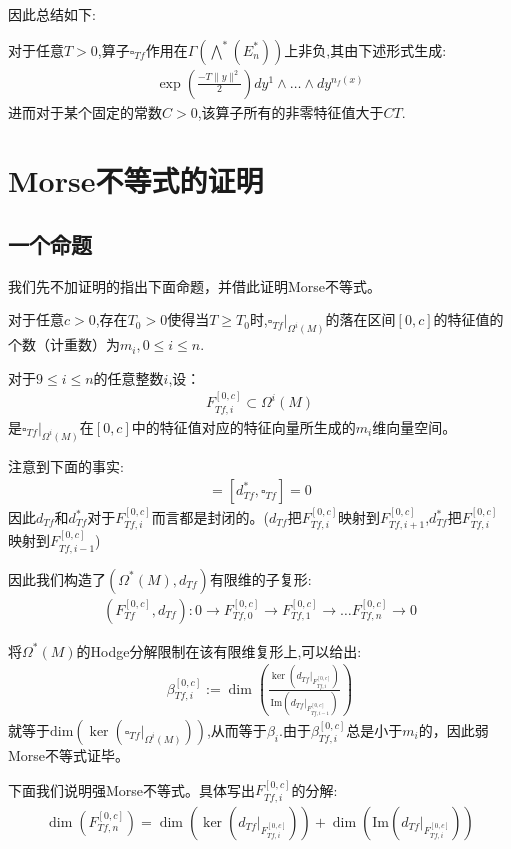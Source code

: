 因此总结如下:
\begin{proposition}
	对于任意$T>0$,算子$\square_{Tf}$作用在$\Gamma(\bigwedge^*(E_n^*))$上非负,其由下述形式生成:
	\begin{align}
		\exp(\frac{-T\|y\|^2}{2})dy^1\wedge \dots \wedge dy^{n_f(x)}
	\end{align}
	进而对于某个固定的常数$C>0$,该算子所有的非零特征值大于$CT$.
\end{proposition}
\section{Morse不等式的证明}
\subsection{一个命题}
我们先不加证明的指出下面命题，并借此证明Morse不等式。
\begin{proposition}
	对于任意$c>0$,存在$T_0>0$使得当$T\geq T_0$时,$\square_{Tf}|_{\Omega^i(M)}$的落在区间$[0,c]$的特征值的个数（计重数）为$m_i,0 \leq i \leq n$.
\end{proposition}

对于$9 \leq i \leq n$的任意整数$i$,设：
\begin{align*}
	F_{Tf,i}^{[0,c]}\subset \Omega^i(M)
\end{align*}
是$\square_{Tf}|_{\Omega^i(M)}$在$[0,c]$中的特征值对应的特征向量所生成的$m_i$维向量空间。

注意到下面的事实:
\begin{align*}
	[d_{Tf},\square_{Tf}]=[d^*_{Tf},\square_{Tf}]=0
\end{align*}
因此$d_{Tf}$和$d_{Tf}^*$对于$F_{Tf,i}^{[0,c]}$而言都是封闭的。($d_{Tf}$把$F_{Tf,i}^{[0,c]}$映射到$F_{Tf,i+1}^{[0,c]}$,$d^*_{Tf}$把$F_{Tf,i}^{[0,c]}$映射到$F_{Tf,i-1}^{[0,c]}$)

因此我们构造了$(\Omega^*(M),d_{Tf})$有限维的子复形:
\begin{align}
	(F_{Tf}^{[0,c]},d_{Tf}):0 \longrightarrow F_{Tf,0}^{[0,c]} \longrightarrow F_{Tf,1}^{[0,c]} \longrightarrow \dots F_{Tf,n}^{[0,c]} \longrightarrow 0
\end{align}

将$\Omega^*(M)$的Hodge分解限制在该有限维复形上,可以给出:
\begin{align}
	\beta_{Tf,i}^{[0,c]}:=\dim (\frac{\ker(d_{Tf}|_{F_{Tf,i}^{[0,c]}})}{\mathrm{Im}(d_{Tf}|_{F_{Tf,{i-1}}^{[0,c]}})})
\end{align}
就等于$\mathrm{dim}(\ker(\square_{Tf}|_{\Omega^i(M)}))$,从而等于$\beta_i$.由于$\beta_{Tf,i}^[0,c]$总是小于$m_i$的，因此弱Morse不等式证毕。

下面我们说明强Morse不等式。具体写出$F_{Tf,i}^{[0,c]}$的分解:
\begin{align}
	\dim(F_{Tf,n}^{[0,c]})=\dim(\ker(d_{Tf}|_{F_{Tf,i}^{[0,c]}}))+\dim(\mathrm{Im}(d_{Tf}|_{F_{Tf,i}^{[0,c]}}))
\end{align}
\ifx\allfiles\undefined
	
	
	
	
	\else
	\fi